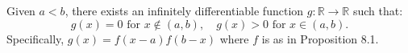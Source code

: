 Given $a < b$, there exists an infinitely differentiable function $g: \mathbb{R} \to \mathbb{R}$ such that:
\[
g(x) = 0 \text{ for } x \notin (a, b), \quad g(x) > 0 \text{ for } x \in (a, b).
\]
Specifically, $g(x) = f(x - a)f(b - x)$ where $f$ is as in Proposition 8.1.
